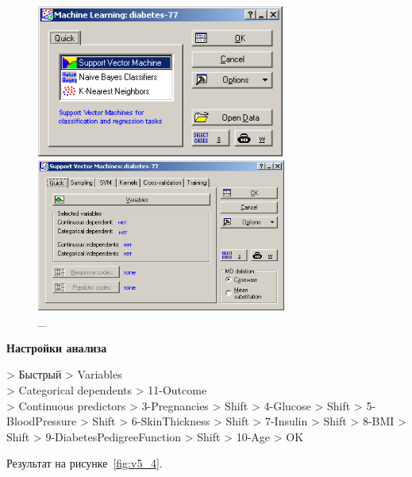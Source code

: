 \begin{figure}[!h]
  \centering

  \begin{minipage}{0.49\textwidth}
    \centering

    \includegraphics[height=5cm]
    {inc/v5_2.PNG}

    \caption{\_}

    \label{fig:v5_2}
  \end{minipage}
  \begin{minipage}{0.49\textwidth}
    \centering

    \includegraphics[height=5cm]
    {inc/v5_3.PNG}

    \caption{\_}

    \label{fig:v5_3}
  \end{minipage}
\end{figure}

\begin{center}
  \textbf{Настройки анализа}
\end{center}

> Быстрый > Variables \\
> Categorical dependents > 11-Outcome \\
> Continuous predictors > 3-Pregnancies
> Shift > 4-Glucose
> Shift > 5-BloodPressure
> Shift > 6-SkinThickness
> Shift > 7-Insulin
> Shift > 8-BMI
> Shift > 9-DiabetesPedigreeFunction
> Shift > 10-Age
> OK

Результат на рисунке~\ref{fig:v5_4}.

